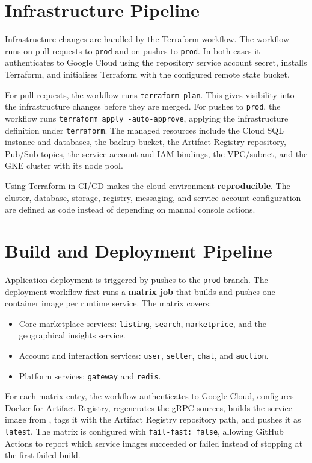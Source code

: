 \section{Infrastructure Pipeline}

Infrastructure changes are handled by the Terraform workflow. The workflow runs on pull requests to \texttt{prod} and on pushes to \texttt{prod}. In both cases it authenticates to Google Cloud using the repository service account secret, installs Terraform, and initialises Terraform with the configured remote state bucket.

For pull requests, the workflow runs \texttt{terraform plan}. This gives visibility into the infrastructure changes before they are merged. For pushes to \texttt{prod}, the workflow runs \texttt{terraform apply -auto-approve}, applying the infrastructure definition under \texttt{terraform}. The managed resources include the Cloud SQL instance and databases, the backup bucket, the Artifact Registry repository, Pub/Sub topics, the service account and IAM bindings, the VPC/subnet, and the GKE cluster with its node pool.

Using Terraform in CI/CD makes the cloud environment \textbf{reproducible}. The cluster, database, storage, registry, messaging, and service-account configuration are defined as code instead of depending on manual console actions.

\section{Build and Deployment Pipeline}

Application deployment is triggered by pushes to the \texttt{prod} branch. The deployment workflow first runs a \textbf{matrix job} that builds and pushes one container image per runtime service. The matrix covers:

\begin{itemize}
    \item Core marketplace services: \texttt{listing}, \texttt{search}, \texttt{marketprice}, and the geographical insights service.
    \item Account and interaction services: \texttt{user}, \texttt{seller}, \texttt{chat}, and \texttt{auction}.
    \item Platform services: \texttt{gateway} and \texttt{redis}.
\end{itemize}

For each matrix entry, the workflow authenticates to Google Cloud, configures Docker for Artifact Registry, regenerates the gRPC sources, builds the service image from , tags it with the Artifact Registry repository path, and pushes it as \texttt{latest}. The matrix is configured with \texttt{fail-fast: false}, allowing GitHub Actions to report which service images succeeded or failed instead of stopping at the first failed build.

